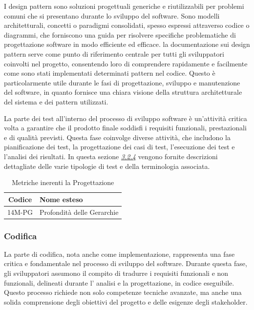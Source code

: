 I design pattern  sono soluzioni progettuali generiche e riutilizzabili per problemi comuni che si presentano durante lo sviluppo del software. Sono modelli architetturali, concetti o paradigmi consolidati, spesso espressi attraverso codice o diagrammi, che forniscono una guida per risolvere specifiche problematiche di progettazione software in modo efficiente ed efficace. la documentazione sui design pattern serve come punto di riferimento centrale per tutti gli sviluppatori coinvolti nel progetto, consentendo loro di comprendere rapidamente e facilmente come sono stati implementati determinati pattern nel codice. Questo è particolarmente utile durante le fasi di progettazione, sviluppo e manutenzione del software, in quanto fornisce una chiara visione della struttura architetturale del sistema e dei pattern utilizzati.

La parte dei test all'interno del processo di sviluppo software è un'attività critica volta a garantire che il prodotto finale soddisfi i requisiti funzionali, prestazionali e di qualità previsti. Questa fase coinvolge diverse attività, che includono la pianificazione dei test, la progettazione dei casi di test, l'esecuzione dei test e l'analisi dei risultati. In questa sezione \hyperref[testing]{\textit{3.2.4}} vengono fornite descrizioni dettagliate delle varie tipologie di test e della terminologia associata.

\begin{table}[!h]
	\centering
	\begin{tabular}{|c|l|}
		\hline
		\textbf{Codice} & \textbf{Nome esteso}   \\
		\hline
		14M-PG & Profondità delle Gerarchie			\\
		\hline
	\end{tabular}
	\caption{Metriche inerenti la Progettazione}
\end{table}


\subsubsection{Codifica}
La parte di codifica, nota anche come implementazione, rappresenta una fase critica e fondamentale nel processo di sviluppo del software. Durante questa fase, gli sviluppatori assumono il compito di tradurre i requisiti funzionali e non funzionali, delineati durante l' analisi e la progettazione, in codice eseguibile. Questo processo richiede non solo competenze tecniche avanzate, ma anche una solida comprensione degli obiettivi del progetto e delle esigenze degli stakeholder.

